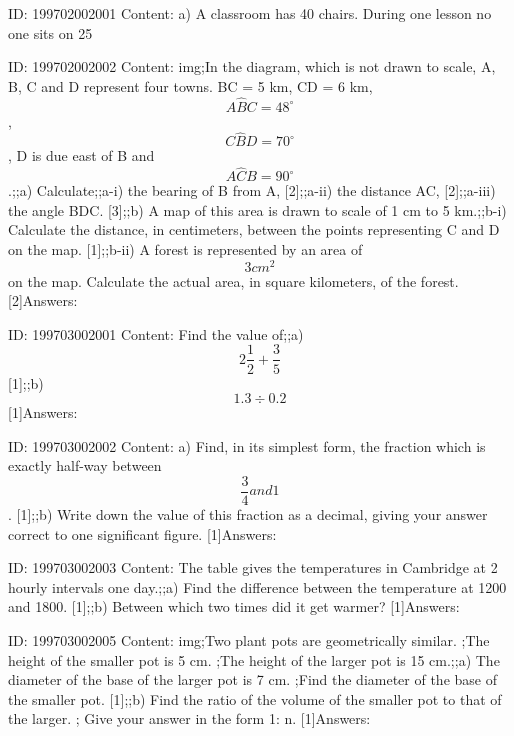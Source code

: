 \documentclass{article}
\begin{document}
ID: 199702002001
Content:
a) A classroom has 40 chairs. During one lesson no one sits on 25%

ID: 199702002002
Content:
img;In the diagram, which is not drawn to scale, A, B, C and D represent four towns. BC = 5 km, CD = 6 km, $$A \hat BC=48^{\circ}$$, $$C \hat BD=70^{\circ}$$, D is due east of B and $$A \hat CB=90^{\circ}$$.;;a) Calculate;;a-i) the bearing of B from A, [2];;a-ii) the distance AC, [2];;a-iii) the angle BDC. [3];;b) A map of this area is drawn to scale of 1 cm to 5 km.;;b-i) Calculate the distance, in centimeters, between the points representing C and D on the map. [1];;b-ii) A forest is represented by an area of $$3cm^{2} $$ on the map. Calculate the actual area, in square kilometers, of the forest. [2]Answers:

ID: 199703002001
Content:
Find the value of;;a) $$2\frac{1}{2}+\frac{3}{5}$$ [1];;b) $$1.3\div 0.2$$ [1]Answers:

ID: 199703002002
Content:
a) Find, in its simplest form, the fraction which is exactly half-way between $$\frac{3}{4} and 1$$. [1];;b) Write down the value of this fraction as a decimal, giving your answer correct to one significant figure.  [1]Answers:

ID: 199703002003
Content:
The table gives the temperatures in Cambridge at 2 hourly intervals one day.;;a) Find the difference between the temperature at 1200 and 1800.  [1];;b) Between which two times did it get warmer?  [1]Answers:

ID: 199703002005
Content:
img;Two plant pots are geometrically similar. ;The height of the smaller pot is 5 cm. ;The height of the larger pot is 15 cm.;;a) The diameter of the base of the larger pot is 7 cm. ;Find the diameter of the base of the smaller pot. [1];;b) Find the ratio of the volume of the smaller pot to that of the larger. ; Give your answer in the form 1: n. [1]Answers:
\end{document}
